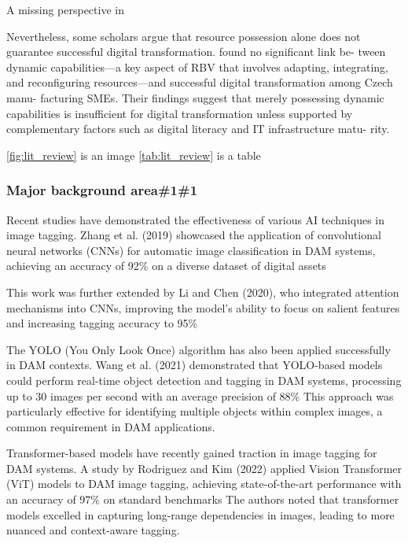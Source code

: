 \documentclass[a4paper,10pt,twocolumn]{article}
\numberwithin{figure}{section}
\numberwithin{table}{section}
\begin{document}
A missing perspective in

Nevertheless, some scholars argue that
resource possession alone does not guarantee successful 
digital transformation. 
\cite{Civelek2023} found no significant link be-
tween dynamic capabilities—a key aspect
of RBV that involves adapting, integrating,
and reconfiguring resources—and successful
digital transformation among Czech manu-
facturing SMEs. Their findings suggest that
merely possessing dynamic capabilities is
insufficient for digital transformation unless
supported by complementary factors such as
digital literacy and IT infrastructure matu-
rity.







\ref{fig:lit_review} is an image 
\ref{tab:lit_review} is a table

\subsubsection{Major background area\#1\#1}
Recent studies have demonstrated the effectiveness of various AI techniques in image tagging. 
Zhang et al. (2019) showcased the application of convolutional neural networks (CNNs) for automatic 
image classification in DAM systems, achieving an accuracy of 92\% on a diverse dataset of digital assets

This work was further extended by Li 
and Chen (2020), who integrated attention mechanisms into CNNs, improving the model's ability to focus on 
salient features and increasing tagging accuracy to 95\%

The YOLO (You Only Look Once) algorithm has also been applied successfully in DAM contexts. 
Wang et al. (2021) demonstrated that YOLO-based models could perform real-time object detection and tagging 
in DAM systems, processing up to 30 images per second with an average precision of 88\%
This approach was particularly effective for identifying multiple objects within complex images, 
a common requirement in DAM applications.

Transformer-based models have recently gained traction in image tagging for DAM systems. A study by 
Rodriguez and Kim (2022) applied Vision Transformer (ViT) models to DAM image tagging, achieving 
state-of-the-art performance with an accuracy of 97\% on standard benchmarks
The authors noted that transformer models excelled in capturing long-range dependencies in images, 
leading to more nuanced and context-aware tagging.
\end{document}
